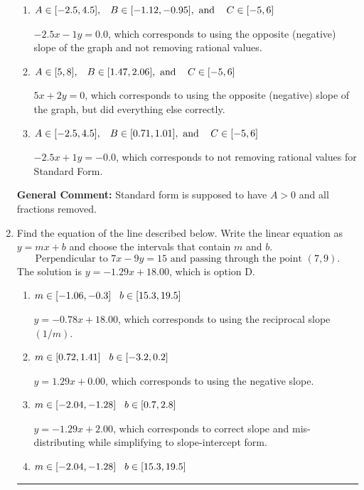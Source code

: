 \documentclass{extbook}[14pt]
\newcommand{\litem}[1]{\item #1

\rule{\textwidth}{0.4pt}}
\begin{document}
\begin{enumerate}
{\begin{enumerate}[label=\Alph*.]
* $5x - 2y = 0$, which is the correct option.
\item \( A \in [-2.5, 4.5], \hspace{3mm} B \in [-1.12, -0.95], \text{ and } \hspace{3mm} C \in [-5, 6] \)

 $-2.5x - 1y = 0.0$, which corresponds to using the opposite (negative) slope of the graph and not removing rational values.
\item \( A \in [5, 8], \hspace{3mm} B \in [1.47, 2.06], \text{ and } \hspace{3mm} C \in [-5, 6] \)

 $5x + 2y = 0$, which corresponds to using the opposite (negative) slope of the graph, but did everything else correctly.
\item \( A \in [-2.5, 4.5], \hspace{3mm} B \in [0.71, 1.01], \text{ and } \hspace{3mm} C \in [-5, 6] \)

 $-2.5x + 1y = -0.0$, which corresponds to not removing rational values for Standard Form.
\end{enumerate}

\textbf{General Comment:} Standard form is supposed to have $A > 0$ and all fractions removed.
}
\litem{
Find the equation of the line described below. Write the linear equation as $ y=mx+b $ and choose the intervals that contain $m$ and $b$.
\[ \text{Perpendicular to } 7 x - 9 y = 15 \text{ and passing through the point } (7, 9). \]
The solution is \( y = -1.29x + 18.00 \), which is option D.\begin{enumerate}[label=\Alph*.]
\item \( m \in [-1.06, -0.3] \hspace*{3mm} b \in [15.3, 19.5] \)

 $y = -0.78x + 18.00$, which corresponds to using the reciprocal slope $(1/m)$.
\item \( m \in [0.72, 1.41] \hspace*{3mm} b \in [-3.2, 0.2] \)

 $y = 1.29x + 0.00$, which corresponds to using the negative slope.
\item \( m \in [-2.04, -1.28] \hspace*{3mm} b \in [0.7, 2.8] \)

 $y = -1.29x + 2.00$, which corresponds to correct slope and mis-distributing while simplifying to slope-intercept form.
\item \( m \in [-2.04, -1.28] \hspace*{3mm} b \in [15.3, 19.5] \)


\end{enumerate}}
\end{enumerate}
\end{document}
